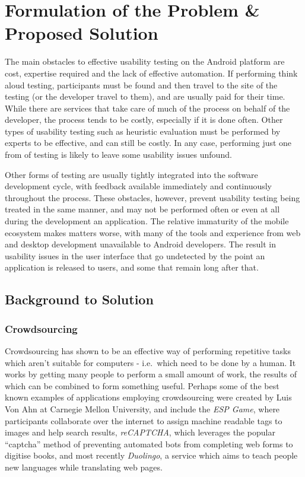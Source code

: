 \chapter{Formulation of the Problem \& Proposed Solution}

The main obstacles to effective usability testing on the Android platform are
cost, expertise required and the lack of effective automation.  If performing
think aloud testing, participants must be found and then travel to the site of
the testing (or the developer travel to them), and are usually paid for their
time. While there are services that take care of much of the process on behalf
of the developer, the process tends to be costly, especially if it is done
often.  Other types of usability testing such as heuristic evaluation must be
performed by experts to be effective, and can still be costly.  In any case,
performing just one from of testing is likely to leave some usability issues
unfound.

Other forms of testing are usually tightly integrated into the software development
cycle, with feedback available immediately and continuously throughout the process.
These obstacles, however, prevent usability testing being treated in the same manner,
and may not be performed often or
even at all during the development an application. The relative immaturity of the mobile
ecosystem makes matters worse, with many of the tools and experience from web and
desktop development unavailable to Android developers. The result in usability
issues in the user interface that go undetected by the point an application is
released to users, and some that remain long after that.

\section{Background to Solution}

\subsection{Crowdsourcing}

Crowdsourcing has shown to be an effective way of performing repetitive tasks
which aren't suitable for computers - i.e.\ which need to be done by a human. It
works by getting many people to perform a small amount of work, the results of
which can be combined to form something useful. Perhaps some of the best known
examples of applications employing crowdsourcing were created by Luis Von Ahn
at Carnegie Mellon University, and include the \emph{ESP Game}, where
participants collaborate over the internet to assign machine readable tags to
images and help search results, \emph{reCAPTCHA}, which leverages the popular
``captcha'' method of preventing automated bots from completing web forms to
digitise books, and most recently \emph{Duolingo}, a service which aims to
teach people new languages while translating web pages.

